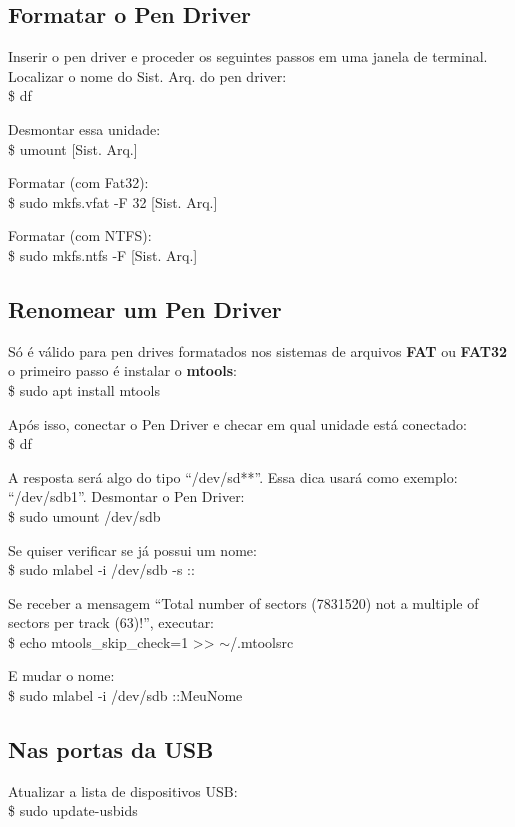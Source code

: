 \subsection{Formatar o Pen Driver}
Inserir o pen driver e proceder os seguintes passos em uma janela de terminal. Localizar o nome do Sist. Arq. do pen driver: \\
{\ttfamily\$ df}

Desmontar essa unidade: \\
{\ttfamily\$ umount [Sist. Arq.]}

Formatar (com Fat32): \\
{\ttfamily\$ sudo mkfs.vfat -F 32 [Sist. Arq.]}

Formatar (com NTFS): \\
{\ttfamily\$ sudo mkfs.ntfs -F [Sist. Arq.]}

\subsection{Renomear um Pen Driver}
Só é válido para pen drives formatados nos sistemas de arquivos \textbf{FAT} ou \textbf{FAT32} o primeiro passo é instalar o \textbf{mtools}: \\
{\ttfamily\$ sudo apt install mtools}

Após isso, conectar o Pen Driver e checar em qual unidade está conectado: \\
{\ttfamily\$ df}

A resposta será algo do tipo ``/dev/sd**''. Essa dica usará como exemplo: ``/dev/sdb1''. Desmontar o Pen Driver: \\
{\ttfamily\$ sudo umount /dev/sdb}

Se quiser verificar se já possui um nome: \\
{\ttfamily\$ sudo mlabel -i /dev/sdb -s ::}

Se receber a mensagem ``Total number of sectors (7831520) not a multiple of sectors per track (63)!'', executar: \\
{\ttfamily\$ echo mtools\_skip\_check=1 >> $\sim$/.mtoolsrc}

E mudar o nome: \\
{\ttfamily\$ sudo mlabel -i /dev/sdb ::MeuNome}

\subsection{Nas portas da USB}
Atualizar a lista de dispositivos USB: \\
{\ttfamily\$ sudo update-usbids}

